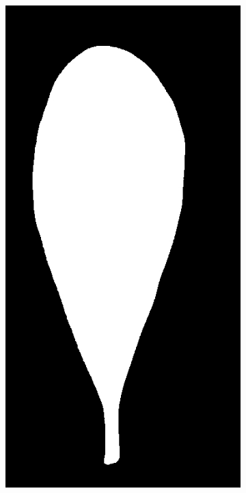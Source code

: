 \begin{frame}
\begin{figure}[ht!]
\begin{subfigure}[b]{0.19\textwidth}
	\end{subfigure}
	\begin{subfigure}[b]{0.19\textwidth}
		\centering
		\includegraphics[width=\textwidth]{img/preprocess.jpg}

\end{subfigure}
\end{figure}
\end{frame}
